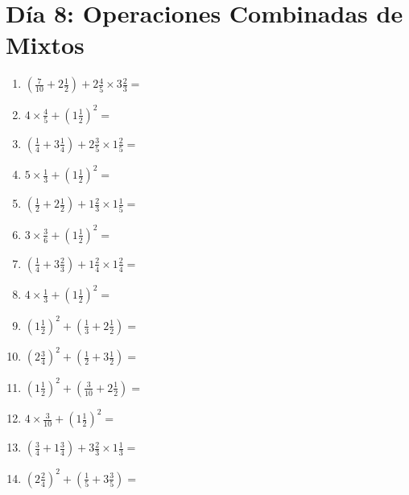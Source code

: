 \documentclass[12pt]{article}
\begin{document}
\section*{Día 8: Operaciones Combinadas de Mixtos}
\begin{enumerate}
\item \large $ (\frac{7}{10} + 2 \frac{1}{2}) + 2 \frac{4}{5} \times 3 \frac{2}{3} = $ \vspace{1.8cm}
\item \large $ 4 \times \frac{4}{5} + (1 \frac{1}{2})^2 = $ \vspace{1.8cm}
\item \large $ (\frac{1}{4} + 3 \frac{1}{4}) + 2 \frac{3}{5} \times 1 \frac{2}{5} = $ \vspace{1.8cm}
\item \large $ 5 \times \frac{1}{3} + (1 \frac{1}{2})^2 = $ \vspace{1.8cm}
\item \large $ (\frac{1}{2} + 2 \frac{1}{2}) + 1 \frac{2}{3} \times 1 \frac{1}{5} = $ \vspace{1.8cm}
\item \large $ 3 \times \frac{3}{6} + (1 \frac{1}{2})^2 = $ \vspace{1.8cm}
\item \large $ (\frac{1}{4} + 3 \frac{2}{3}) + 1 \frac{2}{4} \times 1 \frac{2}{4} = $ \vspace{1.8cm}
\item \large $ 4 \times \frac{1}{3} + (1 \frac{1}{2})^2 = $ \vspace{1.8cm}
\item \large $ (1 \frac{1}{2})^2 + (\frac{1}{3} + 2 \frac{1}{2}) = $ \vspace{1.8cm}
\item \large $ (2 \frac{3}{4})^2 + (\frac{1}{2} + 3 \frac{1}{2}) = $ \vspace{1.8cm}
\newpage
\item \large $ (1 \frac{1}{2})^2 + (\frac{3}{10} + 2 \frac{1}{2}) = $ \vspace{1.8cm}
\item \large $ 4 \times \frac{3}{10} + (1 \frac{1}{2})^2 = $ \vspace{1.8cm}
\item \large $ (\frac{3}{4} + 1 \frac{3}{4}) + 3 \frac{2}{3} \times 1 \frac{1}{3} = $ \vspace{1.8cm}
\item \large $ (2 \frac{2}{4})^2 + (\frac{1}{5} + 3 \frac{3}{5}) = $ \vspace{1.8cm}

\end{enumerate}
\end{document}
